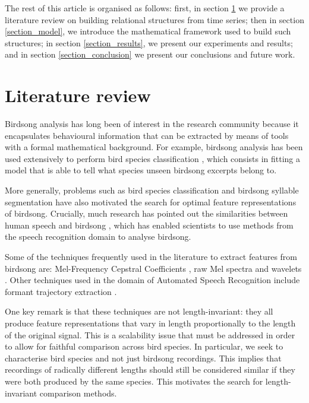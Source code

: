 \documentclass[pdftex,11pt,a4paper]{article}
\theoremstyle{definition}
\theoremstyle{remark}
\begin{document}
\par The rest of this article is organised as follows: first, in section \ref{section_review} we provide a literature review on building relational structures from time series; then in section \ref{section_model}, we introduce the mathematical framework used to build such structures; in section \ref{section_results}, we present our experiments and results; and in section \ref{section_conclusion} we present our conclusions and future work.

\section{Literature review}
\label{section_review}


Birdsong analysis has long been of interest in the research community because it encapsulates behavioural information that can be extracted by means of tools with a formal mathematical background. For example, birdsong analysis has been used extensively to perform bird species classification \cite{Chou2009,Wielgat2012,McIlraith1995,Lee2013,Franzen2003,Silla2013}, which consists in fitting a model that is able to tell what species unseen birdsong excerpts belong to.
\par More generally, problems such as bird species classification and birdsong syllable segmentation have also motivated the search for optimal feature representations of birdsong. Crucially, much research has pointed out the similarities between human speech and birdsong \cite{Snowdon2013,McIlraith1995}, which has enabled scientists to use methods from the speech recognition domain to analyse birdsong.
\par Some of the techniques frequently used in the literature to extract features from birdsong are: Mel-Frequency Cepstral Coefficients \cite{Silla2013,Wielgat2012,Stowell2014,Lopes2011}, raw Mel spectra \cite{Stowell2014} and wavelets \cite{Chou2009}. Other techniques used in the domain of Automated Speech Recognition include formant trajectory extraction \cite{Prica2010,Welling1998}.
\par One key remark is that these techniques are not length-invariant: they all produce feature representations that vary in length proportionally to the length of the original signal. This is a scalability issue that must be addressed in order to allow for faithful comparison across bird species. In particular, we seek to characterise bird species and not just birdsong recordings. This implies that recordings of radically different lengths should still be considered similar if they were both produced by the same species. This motivates the search for length-invariant comparison methods.
\end{document}
